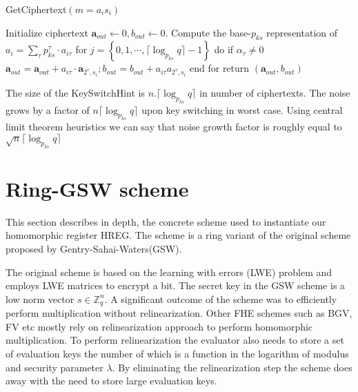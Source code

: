 \documentclass[10pt,journal,compsoc]{IEEEtran}
\theoremstyle{definition}
\begin{document}
\begin{algorithm}
\caption{GetCiphertext$\left( m = a_is_i\right)$}
\begin{algorithmic}[1]
\State Initialize ciphertext $\textbf{a}_{out}\leftarrow 0,b_{out}\leftarrow 0$.
\State Compute the base-$p_{ks}$ representation of $a_i = \sum_{\tau} p_{ks}^{\tau}\cdot a_{i\tau}$
\State for $j = \left\{ 0,1,\cdots,\lceil \log_{p_{ks}} q\rceil -1 \right\}$ do
\State \quad if $\alpha_\tau \neq 0$
\State \quad \quad $\textbf{a}_{out} = \textbf{a}_{out} + a_{i\tau}\cdot\textbf{a}_{2^{\tau},s_i}; b_{out} = b_{out} + a_{i\tau}a_{2^\tau,s_i}$
\State end for
\State return $\left(\textbf{a}_{out},b_{out}\right)$

\EndProcedure
\end{algorithmic}
\end{algorithm}

The size of the KeySwitchHint is $n.\lceil \log_{p_{ks}} q\rceil$ in number of ciphertexts. The noise grows by a factor of $n\lceil \log_{p_{ks}} q\rceil$ upon key switching in worst case. Using central limit theorem heuristics we can say that noise growth factor is roughly equal to $\sqrt{n}\lceil \log_{p_{ks}} q\rceil$

\section{Ring-GSW scheme}

This section describes in depth, the concrete scheme used to instantiate our homomorphic register HREG. The scheme is a ring variant of the original scheme proposed by Gentry-Sahai-Waters(GSW). 

The original scheme is based on the learning with errors (LWE) problem and employs LWE matrices to encrypt a bit. The secret key in the GSW scheme is a low norm vector $s \in \mathbb{Z}_q^n$. A significant outcome of the scheme was to efficiently perform multiplication without relinearization. Other FHE schemes such as BGV, FV etc mostly rely on relinearization approach to perform homomorphic multiplication. To perform relinearization the evaluator also needs to store a set of evaluation keys the number of which is a function in the logarithm of modulus and security parameter $\lambda$. By eliminating the relinearization step the scheme does away with  the need to store large evaluation keys. 
	
\end{document}
